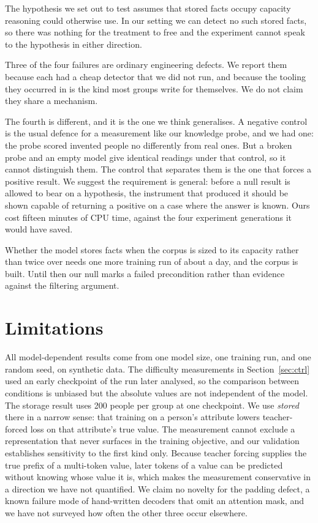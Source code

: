 \documentclass[10pt,twocolumn]{article}
\begin{document}
The hypothesis we set out to test assumes that stored facts occupy capacity
reasoning could otherwise use. In our setting we can detect no such stored
facts, so there was nothing for the treatment to free and the experiment cannot
speak to the hypothesis in either direction.

Three of the four failures are ordinary engineering defects. We report them
because each had a cheap detector that we did not run, and because the tooling
they occurred in is the kind most groups write for themselves. We do not claim
they share a mechanism.

The fourth is different, and it is the one we think generalises. A negative control is the
usual defence for a measurement like our knowledge probe, and we had one: the
probe scored invented people no differently from real ones. But a broken probe
and an empty model give identical readings under that control, so it cannot
distinguish them. The control that separates them is the one that forces a
positive result. We suggest the requirement is general: before a null result is
allowed to bear on a hypothesis, the instrument that produced it should be shown
capable of returning a positive on a case where the answer is known. Ours cost
fifteen minutes of CPU time, against the four experiment generations it would
have saved.

Whether the model stores facts when the corpus is sized to its capacity rather
than twice over needs one more training run of about a day, and the corpus is
built. Until then our null marks a failed precondition rather than evidence
against the filtering argument.

\section{Limitations}
\label{sec:lim}

All model-dependent results come from one model size, one training run, and one
random seed, on synthetic data. The difficulty measurements in
Section~\ref{sec:ctrl} used an early checkpoint of the run later analysed, so
the comparison between conditions is unbiased but the absolute values are not
independent of the model. The storage result uses 200 people per group at one
checkpoint. We use \emph{stored} there in a narrow sense: that training on a
person's attribute lowers teacher-forced loss on that attribute's true value.
The measurement cannot exclude a representation that never surfaces in the
training objective, and our validation establishes sensitivity to the first
kind only. Because teacher forcing supplies the true prefix of a multi-token
value, later tokens of a value can be predicted without knowing whose value it
is, which makes the measurement conservative in a direction we have not
quantified. We claim no novelty for the
padding defect, a known failure mode of hand-written decoders that omit an
attention mask, and we have not surveyed how often the other three occur
elsewhere.
\end{document}
